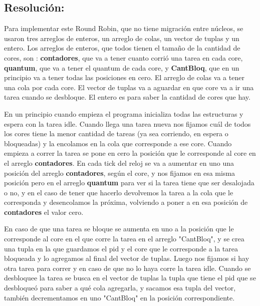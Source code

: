 \documentclass[10pt, a4paper]{article}
\begin{document}
\subsection{Resolución:}

Para implementar este Round Robin, que no tiene migración entre núcleos, se usaron tres arreglos de enteros, un arreglo de colas, un vector de tuplas y un entero. Los arreglos de enteros, que todos tienen el tamaño de la cantidad de cores, son : \textbf{contadores}, que va a tener cuanto corrió una tarea en cada core, \textbf{quantum}, que va a tener el quantum de cada core, y \textbf{CantBloq}, que en un principio va a tener todas las posiciones en cero. El arreglo de colas va a tener una cola por cada core. El vector de tuplas va a aguardar en que core va a ir una tarea cuando se desbloque. El entero es para saber la cantidad de cores que hay.

En un principio cuando empieza el programa inicializa todas las estructuras y espera con la tarea idle. Cuando llega una tarea nueva nos fijamos cuál de todos los cores tiene la menor cantidad de tareas (ya sea corriendo, en espera o bloqueadas) y la encolamos en la cola que corresponde a ese core. Cuando empieza a correr la tarea se pone en cero la posición que le corresponde al core en el arreglo \textbf{contadores}. En cada tick del reloj se va a aumentar en uno una posición  del arreglo \textbf{contadores}, según el core, y nos fijamos en esa misma posición pero en el arreglo \textbf{quantum} para ver si la tarea tiene que ser desalojada o no, y en el caso de tener que hacerlo devolvemos la tarea a la cola que le corresponda y desencolamos la próxima, volviendo a poner a en esa posición de \textbf{contadores} el valor cero.

En caso de que una tarea se bloque se aumenta en uno a la posición que le corresponde al core en el que corre la tarea en el arreglo "CantBloq", y se crea una tupla en la que guardamos el pid y el core que le corresponde a la tarea bloqueada y lo agregamos al final del vector de tuplas. Luego nos fijamos si hay otra tarea para correr y en caso de que no lo haya corre la tarea idle. Cuando se desbloquee la tarea se busca en el vector de tuplas la tupla que tiene el pid que se desbloqueó para saber a qué cola agregarla, y sacamos esa tupla del vector, también decrementamos en uno "CantBloq" en la posición correspondiente.
\end{document}
